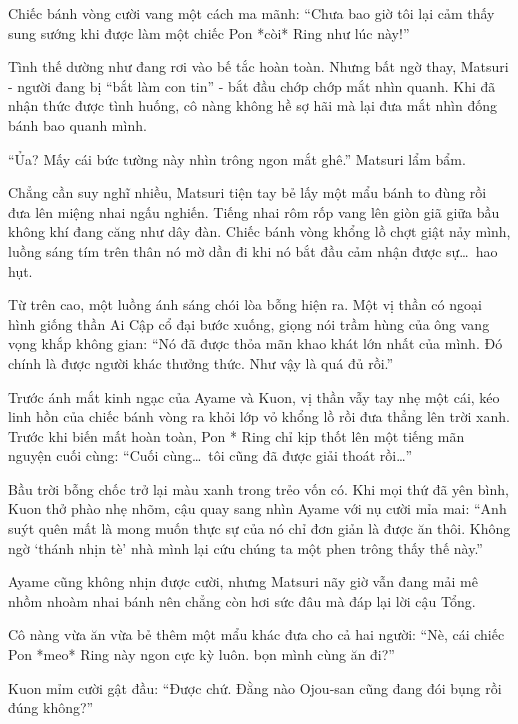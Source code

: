 \documentclass[../main.tex]{subfiles}
\begin{document}
Chiếc bánh vòng cười vang một cách ma mãnh: ``Chưa bao giờ tôi lại cảm thấy sung sướng khi được làm một chiếc Pon *còi* Ring như lúc này!''

Tình thế dường như đang rơi vào bế tắc hoàn toàn. Nhưng bất ngờ thay, Matsuri - người đang bị ``bắt làm con tin'' - bắt đầu chớp chớp mắt nhìn quanh. Khi đã nhận thức được tình huống, cô nàng không hề sợ hãi mà lại đưa mắt nhìn đống bánh bao quanh mình.

``Ủa? Mấy cái bức tường này nhìn trông ngon mắt ghê.'' Matsuri lẩm bẩm.


Chẳng cần suy nghĩ nhiều, Matsuri tiện tay bẻ lấy một mẩu bánh to đùng rồi đưa lên miệng nhai ngấu nghiến. Tiếng nhai rôm rốp vang lên giòn giã giữa bầu không khí đang căng như dây đàn. Chiếc bánh vòng khổng lồ chợt giật nảy mình, luồng sáng tím trên thân nó mờ dần đi khi nó bắt đầu cảm nhận được sự\dots\ hao hụt.

Từ trên cao, một luồng ánh sáng chói lòa bỗng hiện ra. Một vị thần có ngoại hình giống thần Ai Cập cổ đại bước xuống, giọng nói trầm hùng của ông vang vọng khắp không gian: ``Nó đã được thỏa mãn khao khát lớn nhất của mình. Đó chính là được người khác thưởng thức. Như vậy là quá đủ rồi.''


Trước ánh mắt kinh ngạc của Ayame và Kuon, vị thần vẫy tay nhẹ một cái, kéo linh hồn của chiếc bánh vòng ra khỏi lớp vỏ khổng lồ rồi đưa thẳng lên trời xanh. Trước khi biến mất hoàn toàn, Pon * Ring chỉ kịp thốt lên một tiếng mãn nguyện cuối cùng: ``Cuối cùng\dots\ tôi cũng đã được giải thoát rồi\dots''

Bầu trời bỗng chốc trở lại màu xanh trong trẻo vốn có. Khi mọi thứ đã yên bình, Kuon thở phào nhẹ nhõm, cậu quay sang nhìn Ayame với nụ cười mỉa mai: ``Anh suýt quên mất là mong muốn thực sự của nó chỉ đơn giản là được ăn thôi. Không ngờ `thánh nhịn tè' nhà mình lại cứu chúng ta một phen trông thấy thế này.''

Ayame cũng không nhịn được cười, nhưng Matsuri nãy giờ vẫn đang mải mê nhồm nhoàm nhai bánh nên chẳng còn hơi sức đâu mà đáp lại lời cậu Tổng.


Cô nàng vừa ăn vừa bẻ thêm một mẩu khác đưa cho cả hai người: ``Nè, cái chiếc Pon *meo* Ring này ngon cực kỳ luôn. bọn mình cùng ăn đi?''

Kuon mỉm cười gật đầu: ``Được chứ. Đằng nào Ojou-san cũng đang đói bụng rồi đúng không?''
\end{document}
